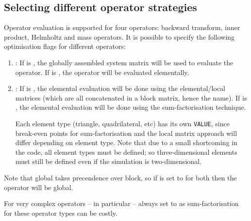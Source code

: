 \subsection{Selecting different operator strategies}

Operator evaluation is supported for four operators: backward transform, inner
product, Helmholtz and mass operators. It is possible to specify the following
optimisation flags for different operators:

\begin{enumerate}
  \item {}: If  is , the globally
  assembled system matrix will be used to evaluate the operator. If
   is , the operator will be evaluated elementally.
  \item {}: If  is , the elemental
  evaluation will be done using the elemental/local matrices (which are all
  concatenated in a block matrix, hence the name). If  is
  , the elemental evaluation will be done using the sum-factorisation
  technique.

  Each element type (triangle, quadrilateral, etc) has its own \texttt{VALUE},
  since break-even points for sum-factorisation and the local matrix approach
  will differ depending on element type. Note that due to a small shortcoming in
  the code, all element types must be defined; so three-dimensional elements
  must still be defined even if the simulation is two-dimensional.
\end{enumerate}

Note that global takes precendence over block, so if  is set to
 for both then the operator will be global.

For very complex operators -- in particular  -- always
set  to  as sum-factorisation for these
operator types can be costly.

